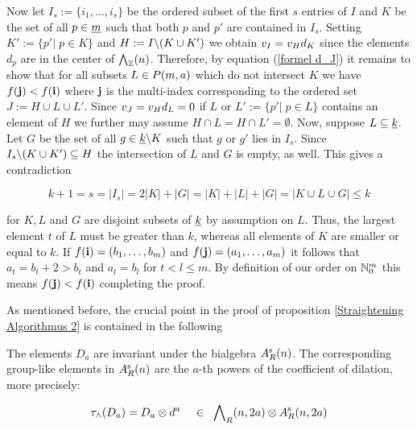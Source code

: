 \documentclass[twoside,12pt]{article}
\begin{document}
\begin{Pf}
Now let $I_s:=\{i_1,\ldots , i_s\}$ be the ordered subset of the first
$s$ entries of $I$ and
$K$ be the set of all $p\in \underline{m}$ such that both $p$ and $p'$
are contained in $I_s$. Setting $K':=\{p'|\; p\in K\}$ and 
$H:=I\backslash (K\cup K')$
we obtain $v_{I}=v_{H}d_K$ since the elements $d_p$ are in the
center of ${\bigwedge}_{{\mathbb Z}}(n)$. Therefore, by equation (\ref{formel d_J})
it remains to show that for all subsets $L\in P({m},{a})$ which
do not intersect $K$ we have $f({\bf j})<f({\bf i})$ where
${\bf j}$ is the multi-index corresponding to the ordered set $J:=H\cup L \cup
L'$. Since $v_{J}=v_{H}d_L=0$ if $L$ or $L':=\{p'|\; p \in L\}$ contains an
element of $H$ we further may assume $H\cap L=H\cap L'=\emptyset$.
Now, suppose $L\subseteq \underline{k}$. Let $G$ be the set of all $g \in \underline{k}\backslash K$
such that $g$ or $g'$ lies in $I_s$. Since $I_s\backslash (K\cup
K')\subseteq H$ the intersection of $L$ and $G$ is empty, as well.
This gives a contradiction

\[ k+1=s=|I_s|=2|K|+|G|=|K|+|L|+|G|=|K\cup L\cup G|\leq k \]

for $K, L$ and $G$ are disjoint subsets of $\underline{k}$ by assumption on
$L$. Thus, the largest element $t$ of
$L$ must be greater than $k$, whereas all
elements of $K$ are smaller or equal to $k$. If $f({\bf i})=(b_1,
\ldots , b_m)$ and $f({\bf j})=(a_1, \ldots, a_m)$ 
it follows that $a_t=b_t+2>b_t$ and
$a_l=b_l$ for $t<l\leq m$. By definition of our order on ${\mathbb N}_0^m$ this
means $f({\bf j})<f({\bf i})$ completing the proof.
\end{Pf}


As mentioned before, the crucial point in the proof of proposition
\ref{Straightening Algorithmus 2} is contained in the following

\begin{prop} \label{D_a invariant}
The elements $D_a$ are invariant under the bialgebra $A^{{\rm s}}_{R}(n)$. The
corresponding group-like elements in $A^{{\rm s}}_{R}(n)$ are the $a$-th powers of the
coefficient of dilation, more precisely:

\[ \tau_{\wedge}(D_a)=D_a\otimes d^a \;\;\;\;\in \;\;
{\bigwedge}_{R}(n,2a) \otimes A^{{\rm s}}_{R}(n,2a)
\]
\end{prop}
\end{document}
